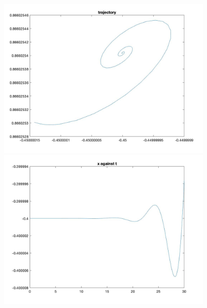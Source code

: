 \documentclass[11pt]{article}
\begin{document}
\begin{figure}[H]
\includegraphics[width = 12cm, height = 8cm]{Q5(9).jpg}
\includegraphics[width = 12cm, height = 8cm]{Q5(10).jpg}
\end{figure}
\end{document}
